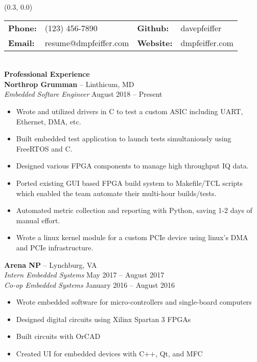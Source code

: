 \documentclass[10pt]{article}
\begin{document}
  \begin{textblock}{0.7}(0.3, 0.0)

    \begin{tabular}{ l l l l }
      \bfseries Phone: & (123) 456-7890 & 
      \bfseries Github: & davepfeiffer \\
      \bfseries Email: & resume@dmpfeiffer.com & 
      \bfseries Website: & dmpfeiffer.com \\
    \end{tabular} \\

    \textbf{\large Professional Experience} \\
      \textbf{Northrop Grumman} -- Linthicum, MD \\
      \textit{Embedded Softare Engineer} \hfill August 2018 -- Present
      \begin{itemize}
        \setlength{\itemsep}{0pt}
        \item Wrote and utilized drivers in C to test a custom ASIC including UART, Ethernet, DMA, etc.
        \item Built embedded test application to launch tests simultaniously using FreeRTOS and C.
        \item Designed various FPGA components to manage high throughput IQ data.
        \item Ported existing GUI based FPGA build system to Makefile/TCL scripts which enabled the team automate their multi-hour builds/tests.
        \item Automated metric collection and reporting with Python, saving 1-2 days of manual effort.
        \item Wrote a linux kernel module for a custom PCIe device using linux's DMA and PCIe infrastructure.
      \end{itemize}
      \textbf{Arena NP} -- Lynchburg, VA \\
      \textit{Intern Embedded Systems} \hfill May 2017 -- August 2017 \\
      \textit{Co-op Embedded Systems} \hfill January 2016 -- August 2016
      \begin{itemize}
        \setlength{\itemsep}{0pt}
        \item Wrote embedded software for micro-controllers and single-board computers
        \item Designed digital circuits using Xilinx Spartan 3 FPGAs
        \item Built circuits with OrCAD
        \item Created UI for embedded devices with C++, Qt, and MFC

\end{itemize}
\end{textblock}
\end{document}
